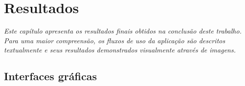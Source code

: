 \chapter{Resultados}
\label{cap:04}

\textit{Este capítulo apresenta os resultados finais obtidos na conclusão deste trabalho. Para uma maior compreensão, os fluxos de uso da aplicação são descritos textualmente e seus resultados demonstrados visualmente através de imagens.}\\


\section{Interfaces gráficas}